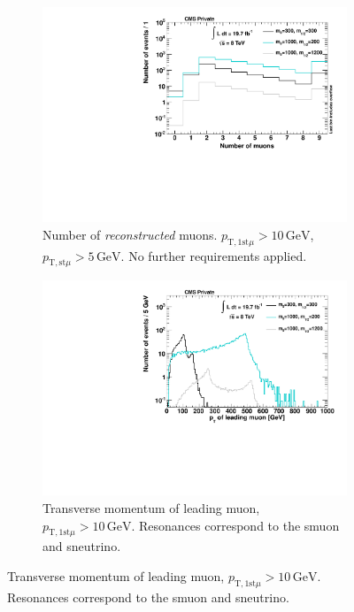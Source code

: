 \begin{figure}[!htbp]
  \centering
  \begin{subfigure}[b]{0.495\textwidth}
    \centering
    \includegraphics[width=\textwidth]{plots/sig_muo_n.pdf}
    \caption{Number of \textit{reconstructed} muons. $p_{\text{T}, 1\text{st} \mu} > 10\,\text{GeV}$, $p_{\text{T}, \text{st} \mu} > 5\,\text{GeV}$. No further requirements applied.\label{fig:sig_muo_n}}
  \end{subfigure}
  \begin{subfigure}[b]{0.495\textwidth}
    \centering
    \includegraphics[width=\textwidth]{plots/sig_muo_pt1.pdf}
    \caption{Transverse momentum of leading muon, $p_{\text{T}, 1\text{st} \mu} > 10\,\text{GeV}$. Resonances correspond to the smuon and sneutrino\footnotemark.\label{fig:sig_muo_pt1}}
  \end{subfigure}
\end{figure}

